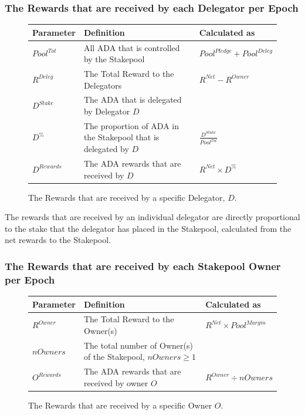 \documentclass[11pt,a4paper,dvipsnames,twosided,final]{article}
\newcommand{\ada}{ADA{}}
\begin{document}
\subsubsection*{The Rewards that are received by each Delegator per Epoch}

\begin{figure}[h!]
\begin{center}
\begin{tabular}{||l|p{9cm}|l||}
  \hline \hline
\textbf{Parameter} & \textbf{Definition} & \textbf{Calculated as} \\\hline
${\textit{Pool}}^{Tot}$ & All \ada{} that is controlled by the Stakepool & ${\textit{Pool}}^\textit{Pledge} + {\textit{Pool}}^\textit{Deleg}$ \\\hline
$R^{Deleg}$ & The Total Reward to the Delegators & $R^{\textit{Net}} - R^\textit{Owner}$ \\\hline
$D^{Stake}$ & The \ada{} that is delegated by Delegator $D$ & \\\hline
$D^\%$ & The proportion of \ada{} in the Stakepool that is delegated by $D$ & $\frac{D^{Stake}}{Pool^{Tot}}$ \\\hline
$D^{Rewards}$ & The \ada{} rewards that are received by $D$ & $R^{\textit{Net}} \times D^\%$ \\\hline
\hline
\end{tabular}
\end{center}
\caption{The Rewards that are received by a specific Delegator, $D$.}
\end{figure}

\noindent
The rewards that are received by an individual delegator are directly proportional to the
stake that the delegator has placed in the Stakepool, calculated from the net rewards to the
Stakepool.

\clearpage
\subsubsection*{The Rewards that are received by each Stakepool Owner per Epoch}

\begin{figure}[h!]
\begin{center}
\begin{tabular}{||l|p{6cm}|l||}
  \hline \hline
\textbf{Parameter}  & \textbf{Definition} & \textbf{Calculated as} \\\hline
$R^\textit{Owner}$ & The Total Reward to the Owner(s) & $R^{\textit{Net}} \times {\textit{Pool}}^{\textit{Margin}} $ \\\hline
$\textit{nOwners}$ & The total number of Owner(s) of the Stakepool, $\textit{nOwners} \ge 1$  & \\\hline
$O^{Rewards}$ & The \ada{} rewards that are received by owner $O$ & $R^\textit{Owner} \div \textit{nOwners}$ \\\hline
\hline
\end{tabular}
\end{center}
\caption{The Rewards that are received by a specific Owner $O$.}
\end{figure}
\end{document}
